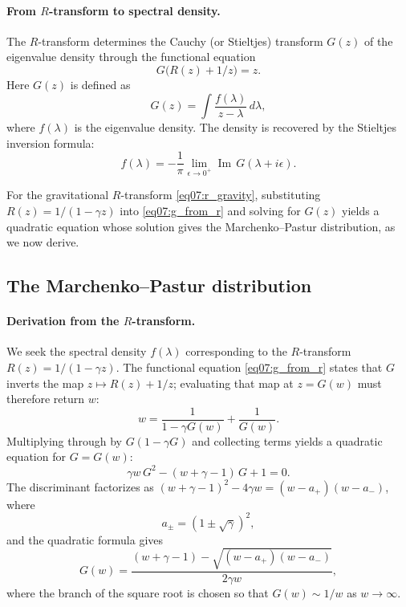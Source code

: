 \documentclass[11pt,letterpaper]{article}
\theoremstyle{plain}
\theoremstyle{definition}
\theoremstyle{remark}
\begin{document}
\paragraph{From $R$-transform to spectral density.}
The $R$-transform determines the Cauchy (or Stieltjes) transform $G(z)$
of the eigenvalue density through the functional equation
\begin{equation}
  G\!\bigl(R(z) + 1/z\bigr) = z.
  \label{eq07:g_from_r}
\end{equation}
Here $G(z)$ is defined as
\begin{equation}
  G(z) = \int \frac{f(\lambda)}{z - \lambda}\, d\lambda,
  \label{eq07:cauchy_transform}
\end{equation}
where $f(\lambda)$ is the eigenvalue density.  The density is recovered by
the Stieltjes inversion formula:
\begin{equation}
  f(\lambda) = -\frac{1}{\pi}
    \lim_{\epsilon \to 0^+} \operatorname{Im}\, G(\lambda + i\epsilon).
  \label{eq07:stieltjes_inversion}
\end{equation}

For the gravitational $R$-transform \eqref{eq07:r_gravity}, substituting
$R(z) = 1/(1-\gamma z)$ into \eqref{eq07:g_from_r} and solving for
$G(z)$ yields a quadratic equation whose solution gives the
Marchenko--Pastur distribution, as we now derive.


\subsection{The Marchenko--Pastur distribution}
\label{subsec07:marchenko_pastur}

\paragraph{Derivation from the $R$-transform.}
We seek the spectral density $f(\lambda)$ corresponding to the
$R$-transform $R(z) = 1/(1-\gamma z)$.  The functional equation
\eqref{eq07:g_from_r} states that $G$ inverts the map
$z \mapsto R(z) + 1/z$; evaluating that map at $z = G(w)$ must therefore
return $w$:
\begin{equation}
  w = \frac{1}{1-\gamma G(w)} + \frac{1}{G(w)}.
  \label{eq07:w_eq}
\end{equation}
Multiplying through by $G(1-\gamma G)$ and collecting terms yields a
quadratic equation for $G = G(w)$:
\begin{equation}
  \gamma w\, G^2 - (w + \gamma - 1)\, G + 1 = 0.
  \label{eq07:quadratic_z}
\end{equation}
The discriminant factorizes as
$(w + \gamma - 1)^2 - 4\gamma w = (w - a_+)(w - a_-)$, where
\begin{equation}
  a_{\pm} = (1 \pm \sqrt{\gamma})^2,
  \label{eq07:mp_edges}
\end{equation}
and the quadratic formula gives
\begin{equation}
  G(w) = \frac{(w + \gamma - 1)
    - \sqrt{(w - a_+)(w - a_-)}}{2\gamma w},
  \label{eq07:cauchy_mp}
\end{equation}
where the branch of the square root is chosen so that
$G(w) \sim 1/w$ as $w \to \infty$.
\end{document}
